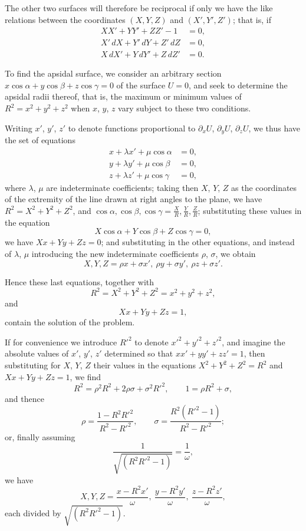 \documentclass[11pt,a4paper]{book}
\begin{document}
The other two surfaces will therefore be reciprocal if only we have
the like relations between the coordinates $(X,Y,Z)$ and $(X',Y',Z')$;
that is, if
\begin{align*}
XX'+YY'+ZZ'-1 &= 0,\\
X'\,dX+Y'\,dY+Z'\,dZ &= 0,\\
X\,dX'+Y\,dY'+Z\,dZ' &= 0.
\end{align*}

To find the apsidal surface, we consider an arbitrary section
$x\cos\alpha+y\cos\beta+z\cos\gamma=0$ of the surface $U=0$, and seek to
determine the apsidal radii thereof, that is, the maximum or minimum
values of $R^2=x^2+y^2+z^2$ when $x$, $y$, $z$ vary subject to these two
conditions.

Writing $x'$, $y'$, $z'$ to denote functions proportional to
$\partial_xU$, $\partial_yU$, $\partial_zU$, we thus have the set of equations
\begin{align*}
x + \lambda x' + \mu\cos\alpha &= 0,\\
y + \lambda y' + \mu\cos\beta &= 0,\\
z + \lambda z' + \mu\cos\gamma &= 0,
\end{align*}
where $\lambda$, $\mu$ are indeterminate coefficients; taking then $X$, $Y$, $Z$ as
the coordinates of the extremity of the line drawn at right angles to the
plane, we have $R^2=X^2+Y^2+Z^2$, and
$\cos\alpha,\cos\beta,\cos\gamma=\frac{X}{R},\frac{Y}{R},\frac{Z}{R}$; substituting these
values in the equation
\[
X\cos\alpha+Y\cos\beta+Z\cos\gamma=0,
\]
we have $Xx+Yy+Zz=0$; and substituting in the other equations,
and instead of $\lambda$, $\mu$ introducing the new indeterminate coefficients
$\rho$, $\sigma$, we obtain
\[
X,Y,Z = \rho x+\sigma x',\ \rho y+\sigma y',\ \rho z+\sigma z'.
\]

Hence these last equations, together with
\[
R^2 = X^2+Y^2+Z^2 = x^2+y^2+z^2,
\]
and
\[
Xx+Yy+Zz=1,
\]
contain the solution of the problem.

If for convenience we introduce $R'^2$ to denote $x'^2+y'^2+z'^2$, and
imagine the absolute values of $x'$, $y'$, $z'$ determined so that
$xx'+yy'+zz'=1$, then substituting for $X$, $Y$, $Z$ their values in the
equations $X^2+Y^2+Z^2=R^2$ and $Xx+Yy+Zz=1$, we find
\[
R^2 = \rho^2R^2 + 2\rho\sigma + \sigma^2R'^2,\qquad 1 = \rho R^2 + \sigma,
\]
and thence
\[
\rho = \frac{1-R^2R'^2}{R^2-R'^2},\qquad \sigma = \frac{R^2(R'^2-1)}{R^2-R'^2};
\]
or, finally assuming
\[
\frac{1}{\sqrt{(R^2R'^2-1)}} = \frac{1}{\omega},
\]
we have
\[
X,Y,Z = \frac{x-R^2x'}{\omega},\ \frac{y-R^2y'}{\omega},\ \frac{z-R^2z'}{\omega},
\]
each divided by $\sqrt{(R^2R'^2-1)}$.
\end{document}
